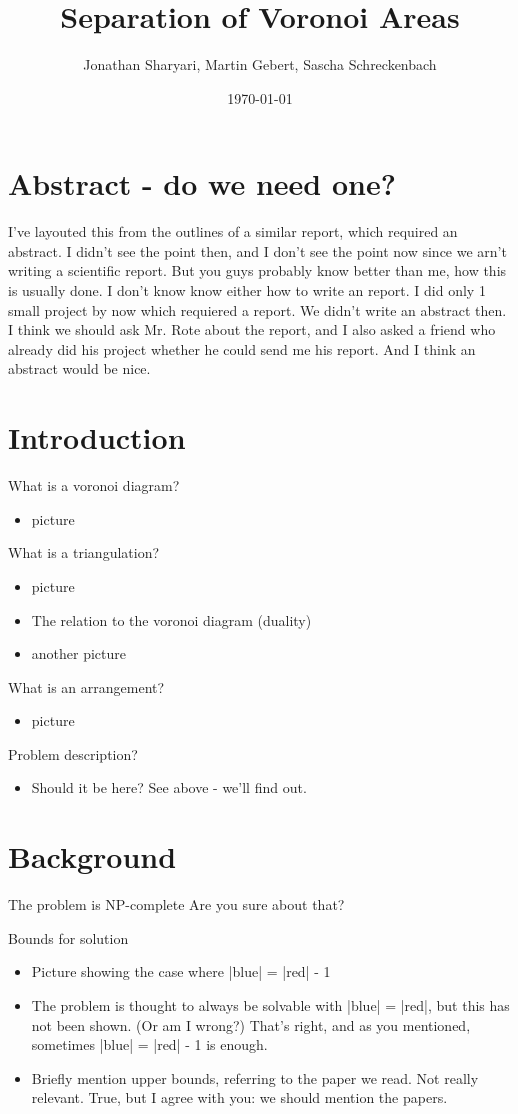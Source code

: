 \documentclass[a4paper,12pt]{article}
\title{\textbf{Separation of Voronoi Areas}}
\author{Jonathan Sharyari, Martin Gebert, Sascha Schreckenbach}  %
\date{\today}
\begin{document}
\maketitle

\section{Abstract - do we need one?}
I've layouted this from the outlines of a similar report, which required an abstract. I didn't see the point then, and I don't see the point now since we arn't writing a scientific report. But you guys probably know better than me, how this is usually done.
I don't know know either how to write an report. I did only 1 small project by now which requiered a report. We didn't write an abstract then. I think we should ask Mr. Rote about the report, and I also asked a friend who already did his project whether he could send me his report. And I think an abstract would be nice.

\section{Introduction}
What is a voronoi diagram?
\begin{itemize}
\item
	picture
\end{itemize}
What is a triangulation?
\begin{itemize}
\item
	picture
\item
	The relation to the voronoi diagram (duality)
\item
	another picture
\end{itemize}

What is an arrangement?
\begin{itemize}
\item
	picture
\end{itemize}

Problem description?

\begin{itemize}
\item
	Should it be here? 
	See above - we'll find out.
\end{itemize}
\section{Background}
The problem is NP-complete
Are you sure about that?

Bounds for solution
\begin{itemize}
\item
	Picture showing the case where |blue| = |red| - 1
\item
	The problem is thought to always be solvable with |blue| = |red|, but this has not been shown. (Or am I wrong?)
	That's right, and as you mentioned, sometimes |blue| = |red| - 1 is enough.
\item
	Briefly mention upper bounds, referring to the paper we read. Not really relevant.
	True, but I agree with you: we should mention the papers.
\end{itemize}
\end{document}
